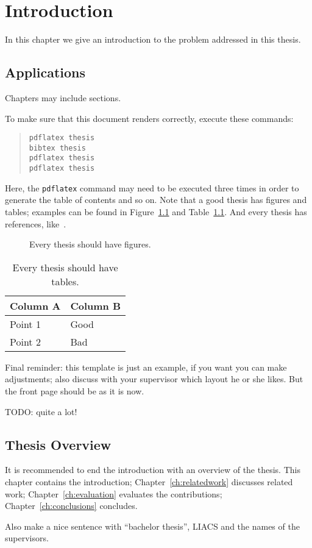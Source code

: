 \chapter{Introduction}  \label{ch:introduction}
In this chapter we give an introduction to the problem addressed in this thesis.


\section{Applications}
Chapters may include sections.

To make sure that this document renders correctly, execute these commands:
\begin{quote}
\begin{verbatim}
pdflatex thesis
bibtex thesis
pdflatex thesis
pdflatex thesis
\end{verbatim}
\end{quote}
Here, the \verb|pdflatex| command may need to be executed three times in order to generate the table of contents and so on. 
Note that a good thesis has figures and tables; examples can be found in Figure~\ref{fig:afigure} and Table~\ref{tab:atable}. And every thesis has references, like~\cite{brilliantgift15}.

\begin{figure}
\begin{center}
\end{center}
\caption{Every thesis should have figures.\label{fig:afigure}}
\end{figure}

\begin{table}
\begin{center}
\begin{tabular}{ll}
Column A & Column B\\
\hline
Point 1 & Good\\
Point 2 & Bad\\
\end{tabular}
\end{center}
\caption{Every thesis should have tables.\label{tab:atable}}
\end{table}

Final reminder: this template is just an example, if you want you can make adjustments; also discuss with your supervisor which layout he or she likes. But the front page should be as it is now.

TODO: quite a lot!

\section{Thesis Overview}
It is recommended to end the introduction with an overview of the thesis. This chapter contains the introduction; Chapter~\ref{ch:relatedwork} discusses related work; Chapter~\ref{ch:evaluation} evaluates the contributions; Chapter~\ref{ch:conclusions} concludes.

Also make a nice sentence with ``bachelor thesis'', LIACS and the names of the supervisors.

